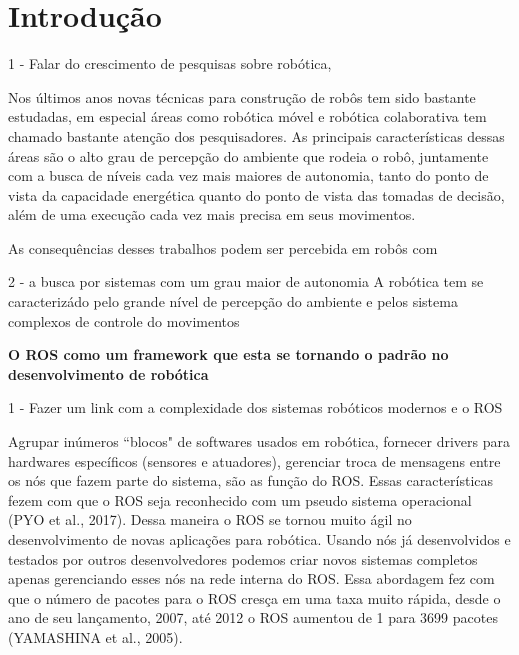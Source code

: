 \chapter{Introdução}

1 - Falar do crescimento de pesquisas sobre robótica, 

Nos últimos anos novas técnicas para construção de robôs tem sido bastante estudadas, em 
especial áreas como robótica móvel e robótica colaborativa tem chamado bastante atenção dos 
pesquisadores. As principais características dessas áreas são o alto grau de percepção do ambiente
que rodeia o robô, juntamente com a busca de níveis cada vez mais maiores de autonomia, tanto
do ponto de vista da capacidade energética quanto do ponto de vista das tomadas de decisão, além 
de uma execução cada vez mais precisa em seus movimentos. 



As consequências desses trabalhos podem ser percebida em robôs com 

2 - a busca por sistemas com um grau maior de autonomia
A robótica tem se caracterizádo pelo grande nível de percepção do ambiente e pelos sistema
complexos de controle do movimentos 


\textbf{O ROS como um framework que esta se tornando o padrão no desenvolvimento de robótica}

1 - Fazer um link com a complexidade dos sistemas robóticos modernos e o ROS

Agrupar inúmeros “blocos" de softwares usados em robótica, fornecer drivers para hardwares
específicos (sensores e atuadores), gerenciar troca de mensagens entre os nós que fazem 
parte do sistema, são as função do ROS. Essas características fezem com que o ROS seja 
reconhecido com um pseudo sistema operacional (PYO et al., 2017). Dessa maneira o ROS se 
tornou muito ágil no desenvolvimento de novas aplicações para robótica. Usando nós já 
desenvolvidos e testados por outros desenvolvedores podemos criar novos sistemas 
completos apenas gerenciando esses nós na rede interna do ROS. Essa abordagem fez com 
que o número de pacotes para o ROS cresça em uma taxa muito rápida, desde o ano de seu 
lançamento, 2007, até 2012 o ROS aumentou de 1 para 3699 pacotes (YAMASHINA et al., 2005).

